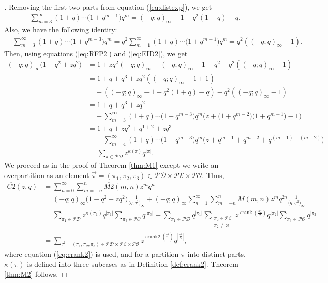 \documentclass[pdftex]{sigma}
\numberwithin{equation}{section}
\newcommand\mylabel[1]{\label{#1}}
\newcommand\thm[1]{\ref{thm:#1}}
\newcommand\eqn[1]{(\ref{eq:#1})}
\newcommand\refdef[1]{\ref{def:#1}}
\begin{document}
\begin{proof}[\unskip\nopunct]
Removing the first two parts from equation \eqn{distexp}, we get
\begin{align}
\mylabel{eq:RFP2}
&\sum\limits_{m=3}^{\infty}(1+q)\cdots\bigl(1+q^{m-1}\bigr)q^m=(-q;q)_{\infty}-1-q^2(1+q)-q.
\end{align}
Also, we have the following identity:
\begin{align}
\mylabel{eq:EID2}
&\sum\limits_{m=3}^{\infty}(1+q)\cdots\bigl(1+q^{m-3}\bigr)q^m=q^2\sum\limits_{m=1}^{\infty}(1+q)\cdots\bigl(1+q^{m-1}\bigr)q^{m}=q^2((-q;q)_{\infty}-1).
\end{align}
Then, using equations \eqn{RFP2} and \eqn{EID2}, we get
\begin{align*}
(-q;q)_{\infty}\bigl(1-q^2+zq^2\bigr)\!&{}=1+zq^2(-q;q)_{\infty}+(-q;q)_{\infty}-1-q^2-q^2((-q;q)_{\infty}-1)
\\
&{}=1+q+q^3+zq^2((-q;q)_{\infty}-1+1)
\\
&\quad{}+((-q;q)_{\infty}-1-q^2(1+q)-q)-q^2((-q;q)_{\infty}-1)
\\
&{}=1+q+q^3+zq^2
\\
&\quad{}+\!\sum\limits_{m=3}^{\infty}(1+q)\cdots\bigl(1+q^{m-3}\bigr)q^{m}\bigl(z+\bigl(1+q^{m-2}\bigr)\bigl(1+q^{m-1}\bigr)-1\bigr)
\\
&{}=1+q+zq^2+q^{1+2}+zq^3
\\
&\quad{}+\!\sum\limits_{m=4}^{\infty}(1+q)\cdots\bigl(1+q^{m-3}\bigr)q^{m}\bigl(z+q^{m-1}\!+q^{m-2}\!+q^{(m-1)+(m-2)}\bigr)
\\
&{}=\!\sum\limits_{\pi \in \mathcal{PD}}z^{\kappa(\pi)}q^{|\pi|}.
\end{align*}
We proceed as in the proof of Theorem \thm{M1} except we write an overpartition as an element $\vec{\pi}=(\pi_1,\pi_2,\pi_3) \in \mathcal{PD} \times \mathcal{PE} \times \mathcal{PO}$.
Thus,
\begin{align*}
\overline{C2}(z,q)&{}=\sum_{n=0}^\infty
\sum_{m=-n}^n \overline{M2}(m,n) z^m q^n
\\
&{}=(-q;q)_{\infty}\bigl(1-q^2+zq^2\bigr)\frac{1}{\bigl(q;q^2\bigr)_{\infty}}+(-q;q)_{\infty}\sum_{n=1}^\infty \sum_{m=-n}^n M(m,n) z^m q^{2n}\frac{1}{\bigl(q;q^2\bigr)_{\infty}}
\\
&{}=\sum\limits_{\pi_1 \in \mathcal{PD}}z^{\kappa(\pi_1)}q^{|\pi_1|}\sum\limits_{\pi_3 \in \mathcal{PO}}q^{|\pi_3|}+\sum\limits_{\pi_1 \in \mathcal{PD}}q^{|\pi_1|}\sum\limits_{\substack{\pi_2 \in \mathcal{PE}\\ \pi_2 \neq \varnothing}}z^{\operatorname{crank}(\frac{\pi_2}{2})}q^{|\pi_2|}\sum\limits_{\pi_3 \in \mathcal{PO}}q^{|\pi_3|}
\\
&{}=\sum\limits_{\vec{\pi} = (\pi_1,\pi_2,\pi_3) \in \mathcal{PD} \times \mathcal{PE} \times \mathcal{PO}}z^{\operatorname{crank2}(\vec{\pi})}q^{|\vec{\pi}|},
\end{align*}
where equation \eqn{crank2} is used, and for a partition $\pi$ into distinct parts, $\kappa(\pi)$ is defined into three subcases as in Definition \refdef{crank2}. Theorem \thm{M2} follows.
\end{proof}
\end{document}
